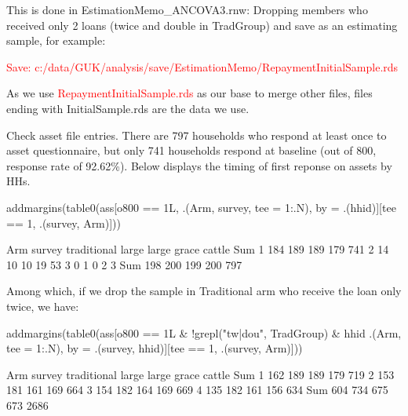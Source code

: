 This is done in \textsf{EstimationMemo\_ANCOVA3.rnw}: Dropping members who received only 2 loans (twice and double in \textsf{TradGroup}) and save as an estimating sample, for example:

\textcolor{red}{Save: c:/data/GUK/analysis/save/EstimationMemo/RepaymentInitialSample.rds}

As we use 
\textcolor{red}{RepaymentInitialSample.rds} as our base to merge other files, files ending with \textsf{InitialSample.rds} are the data we use.


Check asset file entries. There are 797 households who respond at least once to asset questionnaire, but only
741 households respond at baseline (out of 800, response rate of 92.62\%). Below displays the timing of first reponse on assets by HHs. 
\begin{Schunk}
\begin{Sinput}
addmargins(table0(ass[o800 == 1L, .(Arm, survey, tee = 1:.N), 
  by = .(hhid)][tee == 1, .(survey, Arm)]))
\end{Sinput}
\begin{Soutput}
      Arm
survey traditional large large grace cattle Sum
   1           184   189         189    179 741
   2            14    10          10     19  53
   3             0     1           0      2   3
   Sum         198   200         199    200 797
\end{Soutput}
\end{Schunk}
Among which, if we drop the sample in \textsf{Traditional} arm who receive the loan only twice, we have:
\begin{Schunk}
\begin{Sinput}
addmargins(table0(ass[o800 == 1L & !grepl("tw|dou", TradGroup) & 
  hhid %in% hhid[survey==1], 
  .(Arm, tee = 1:.N), by = .(survey, hhid)][tee == 1, .(survey, Arm)]))
\end{Sinput}
\begin{Soutput}
      Arm
survey traditional large large grace cattle  Sum
   1           162   189         189    179  719
   2           153   181         161    169  664
   3           154   182         164    169  669
   4           135   182         161    156  634
   Sum         604   734         675    673 2686
\end{Soutput}
\end{Schunk}




